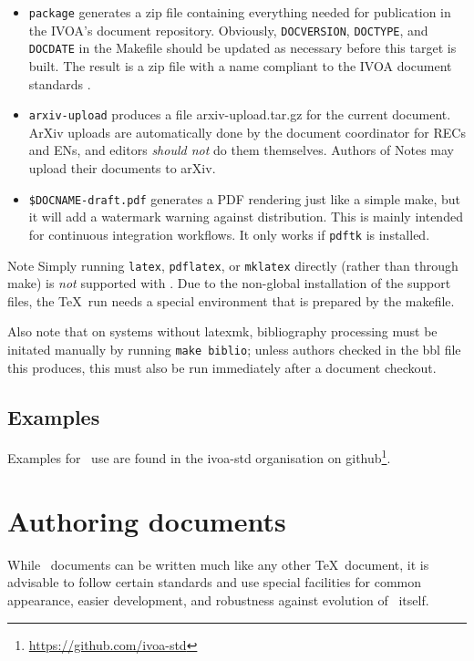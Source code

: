 \documentclass[11pt,a4paper]{ivoa}
\begin{document}
\begin{itemize}
\item \texttt{package} generates a zip file containing everything needed
for publication in the IVOA's document repository.   Obviously,
\texttt{DOCVERSION}, \texttt{DOCTYPE}, and \texttt{DOCDATE} in the
Makefile should be updated as necessary before this target is built.
The result is a zip file with a name compliant to the IVOA document
standards \citep{2017ivoa.spec.0517G}.

\item \texttt{arxiv-upload}  produces a file arxiv-upload.tar.gz for
the current document.  ArXiv uploads are automatically done by the
document coordinator for RECs and ENs, and editors \emph{should not} do
them themselves.  Authors of Notes may upload their documents to arXiv.

\item \texttt{\$DOCNAME-draft.pdf} generates a PDF rendering just like a
simple make, but it will add a watermark warning against distribution.  This is
mainly intended for continuous integration workflows.  It only works
if \verb|pdftk| is installed.
\end{itemize}

\begin{admonition}{Note}
Simply running \texttt{latex}, \texttt{pdflatex},
or \texttt{mklatex} directly
(rather than through make) is \emph{not} supported with \ivoatex.  Due
to the non-global installation of the support files, the \TeX\ run needs
a special environment that is prepared by the makefile.

Also note that on systems without latexmk,
bibliography processing must be initated manually by
running \texttt{make biblio}; unless authors checked in the bbl file
this produces, this must also be run immediately after a document checkout.
\end{admonition}

\subsection{Examples}

Examples for \ivoatex\ use are found in the ivoa-std organisation on
github\footnote{\url{https://github.com/ivoa-std}}.


\section{Authoring documents}
\label{sect:authoring}

While \ivoatex\ documents can be written much like any other \TeX\
document, it is advisable to follow certain standards and use special
facilities for common appearance, easier development, and robustness
against evolution of \ivoatex\ itself.
\end{document}
